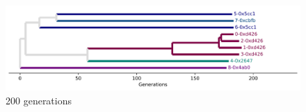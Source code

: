 \begin{figure}
  \centering
  \includegraphics[width=\textwidth]{img/genome=hsurftiltedsticky_tagged+replicate=45e8bb23-7e24-4a17-a493-40123f850a36+viz=draw-biopython-tree+ext=}
  \caption{200 generations}
\end{figure}
